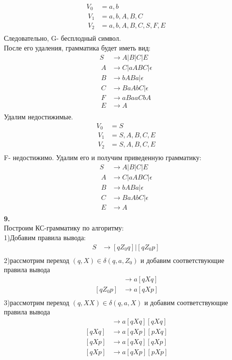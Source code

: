 \documentclass[a4paper,12pt]{article}
\begin{document}
\begin{align*}
	V_0&=a,b\\\
	V_1&=a,b,A,B,C\\\
	V_2&=a,b,A,B,C,S,F,E\\\
\end{align*}
Следовательно, G- бесплодный символ.\\
После его удаления, грамматика будет иметь вид:
\begin{align*}
	S&\to A|B|C|E\\\
	A&\to C|aABC|\epsilon\\\
	B&\to bABa|\epsilon\\\
	C&\to BaAbC|\epsilon\\\
	F&\to aBaaCbA\\\
	E&\to A\\\
\end{align*}
Удалим недостижимые.\\
\begin{align*}
	V_0&=S\\\
	V_1&=S,A,B,C,E\\\
	V_2&=S,A,B,C,E\\\
\end{align*}
F- недостижимо. Удалим его и получим приведенную грамматику:
\begin{align*}
	S&\to A|B|C|E\\\
	A&\to C|aABC|\epsilon\\\
	B&\to bABa|\epsilon\\\
	C&\to BaAbC|\epsilon\\\
	E&\to A\\\
\end{align*}
\textbf{9.}\\
Построим КС-грамматику по алгоритму:\\
1)Добавим правила вывода:\\
\begin{align*}
	S&\to [qZ_0q]|[qZ_0p]\\\
\end{align*}
2)рассмотрим переход $(q,X)\in \delta(q,a,Z_0)$ и добавим соответствующие правила вывода
\begin{align*}
	[qZ_0q]&\to a[qXq]\\\
	[qZ_0p]&\to a[qXp]\\\
\end{align*}
3)рассмотрим переход $(q,XX)\in \delta(q,a,X)$ и добавим соответствующие правила вывода
\begin{align*}
	[qXq]&\to a[qXq][qXq]\\\
	[qXq]&\to a[qXp][pXq]\\\
	[qXp]&\to a[qXq][qXp]\\\
	[qXp]&\to a[qXp][pXp]\\\
\end{align*}
\end{document}
